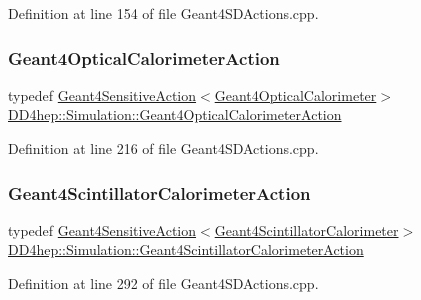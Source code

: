 Definition at line 154 of file Geant4\+S\+D\+Actions.\+cpp.

\hypertarget{namespace_d_d4hep_1_1_simulation_a9b4de3b53a0e39ec195ab057b9b3b971}{}\label{namespace_d_d4hep_1_1_simulation_a9b4de3b53a0e39ec195ab057b9b3b971} 
\subsubsection{\texorpdfstring{Geant4\+Optical\+Calorimeter\+Action}{Geant4OpticalCalorimeterAction}}
{\footnotesize\ttfamily typedef \hyperlink{class_d_d4hep_1_1_simulation_1_1_geant4_sensitive_action}{Geant4\+Sensitive\+Action}$<$\hyperlink{struct_d_d4hep_1_1_simulation_1_1_geant4_optical_calorimeter}{Geant4\+Optical\+Calorimeter}$>$ \hyperlink{namespace_d_d4hep_1_1_simulation_a9b4de3b53a0e39ec195ab057b9b3b971}{D\+D4hep\+::\+Simulation\+::\+Geant4\+Optical\+Calorimeter\+Action}}



Definition at line 216 of file Geant4\+S\+D\+Actions.\+cpp.

\hypertarget{namespace_d_d4hep_1_1_simulation_a518721ad629e0c574145b27d7e1e0c36}{}\label{namespace_d_d4hep_1_1_simulation_a518721ad629e0c574145b27d7e1e0c36} 
\subsubsection{\texorpdfstring{Geant4\+Scintillator\+Calorimeter\+Action}{Geant4ScintillatorCalorimeterAction}}
{\footnotesize\ttfamily typedef \hyperlink{class_d_d4hep_1_1_simulation_1_1_geant4_sensitive_action}{Geant4\+Sensitive\+Action}$<$\hyperlink{struct_d_d4hep_1_1_simulation_1_1_geant4_scintillator_calorimeter}{Geant4\+Scintillator\+Calorimeter}$>$ \hyperlink{namespace_d_d4hep_1_1_simulation_a518721ad629e0c574145b27d7e1e0c36}{D\+D4hep\+::\+Simulation\+::\+Geant4\+Scintillator\+Calorimeter\+Action}}



Definition at line 292 of file Geant4\+S\+D\+Actions.\+cpp.

